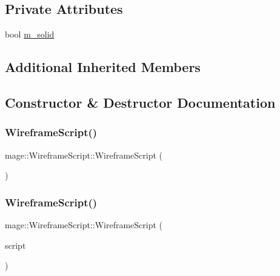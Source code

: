 \subsection*{Private Attributes}
\begin{DoxyCompactItemize}
\item 
bool \hyperlink{classmage_1_1_wireframe_script_a5e038a5e1615ab9323132a3e0a228a82}{m\+\_\+solid}
\end{DoxyCompactItemize}
\subsection*{Additional Inherited Members}


\subsection{Constructor \& Destructor Documentation}
\hypertarget{classmage_1_1_wireframe_script_a3dc73b04bdab31e19b46360bfe5f4766}{}\label{classmage_1_1_wireframe_script_a3dc73b04bdab31e19b46360bfe5f4766} 
\subsubsection{\texorpdfstring{Wireframe\+Script()}{WireframeScript()}\hspace{0.1cm}{\footnotesize\ttfamily [1/3]}}
{\footnotesize\ttfamily mage\+::\+Wireframe\+Script\+::\+Wireframe\+Script (\begin{DoxyParamCaption}{ }\end{DoxyParamCaption})\hspace{0.3cm}{\ttfamily [explicit]}}

\hypertarget{classmage_1_1_wireframe_script_abd35f16fba0de4d370728e832d757473}{}\label{classmage_1_1_wireframe_script_abd35f16fba0de4d370728e832d757473} 
\subsubsection{\texorpdfstring{Wireframe\+Script()}{WireframeScript()}\hspace{0.1cm}{\footnotesize\ttfamily [2/3]}}
{\footnotesize\ttfamily mage\+::\+Wireframe\+Script\+::\+Wireframe\+Script (\begin{DoxyParamCaption}\item[{const \hyperlink{classmage_1_1_wireframe_script}{Wireframe\+Script} \&}]{script }\end{DoxyParamCaption})\hspace{0.3cm}{\ttfamily [delete]}}

